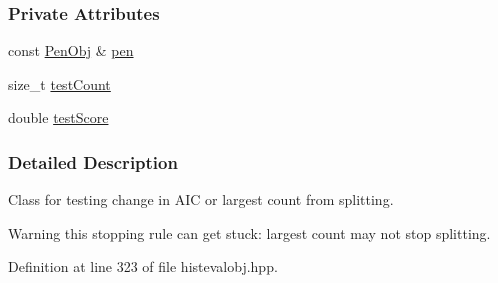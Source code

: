 \subsubsection*{\-Private \-Attributes}
\begin{DoxyCompactItemize}
\item 
const \hyperlink{classsubpavings_1_1PenObj}{\-Pen\-Obj} \& \hyperlink{classsubpavings_1_1CritAICChangeOrLargestCount__LTE_ab103ee5920edae553b76bddc36244e89}{pen}
\item 
size\-\_\-t \hyperlink{classsubpavings_1_1CritAICChangeOrLargestCount__LTE_a18efb7c7d3d958b540124bcf831581c3}{test\-Count}
\item 
double \hyperlink{classsubpavings_1_1CritAICChangeOrLargestCount__LTE_abe3e0f28dc25e6bbdaba43c05a28083d}{test\-Score}
\end{DoxyCompactItemize}


\subsubsection{\-Detailed \-Description}
\-Class for testing change in \-A\-I\-C or largest count from splitting. 

\begin{DoxyWarning}{\-Warning}
this stopping rule can get stuck\-: largest count may not stop splitting. 
\end{DoxyWarning}


\-Definition at line 323 of file histevalobj.\-hpp.



